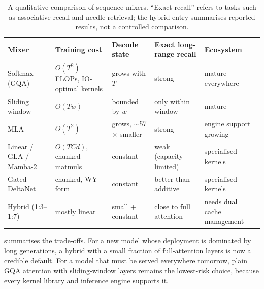 \begin{table}[t]
\centering\small
\begin{tabularx}{\linewidth}{@{}l>{\raggedright\arraybackslash}X>{\raggedright\arraybackslash}X>{\raggedright\arraybackslash}X>{\raggedright\arraybackslash}X@{}}
\toprule
Mixer & Training cost & Decode state & Exact long-range recall & Ecosystem\\
\midrule
Softmax (GQA) & $O(T^2)$ FLOPs, IO-optimal kernels & grows with $T$ & strong & mature everywhere\\
Sliding window & $O(Tw)$ & bounded by $w$ & only within window & mature\\
MLA & $O(T^2)$ & grows, $\sim$57$\times$ smaller & strong & engine support growing\\
Linear / GLA / Mamba-2 & $O(TCd)$, chunked matmuls & constant & weak (capacity-limited) & specialised kernels\\
Gated DeltaNet & chunked, WY form & constant & better than additive & specialised kernels\\
Hybrid (1:3--1:7) & mostly linear & small + constant & close to full attention & needs dual cache management\\
\bottomrule
\end{tabularx}
\caption{A qualitative comparison of sequence mixers. ``Exact recall'' refers to tasks such as associative
recall and needle retrieval; the hybrid entry summarises reported results, not a controlled comparison.}
\label{tab:attnalt:choose}
\end{table}

 summarises the trade-offs. For a new model whose deployment is dominated by long
generations, a hybrid with a small fraction of full-attention layers is now a credible default. For a model
that must be served everywhere tomorrow, plain GQA attention with sliding-window layers remains the
lowest-risk choice, because every kernel library and inference engine supports it.

